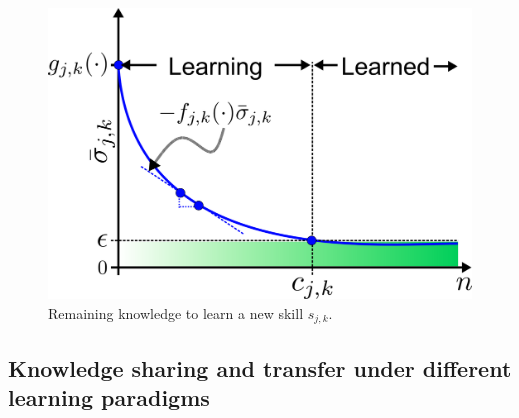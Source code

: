 \begin{figure}[!t]
	\centering
	\includegraphics[width=0.95\columnwidth]{fig/knowledge_idealization.png}
	\caption{Remaining knowledge to learn a new skill $s_{j,k}$.}
	\label{fig:knowledge_idealization}
\end{figure}
\subsection{Knowledge sharing and transfer under different learning paradigms}

